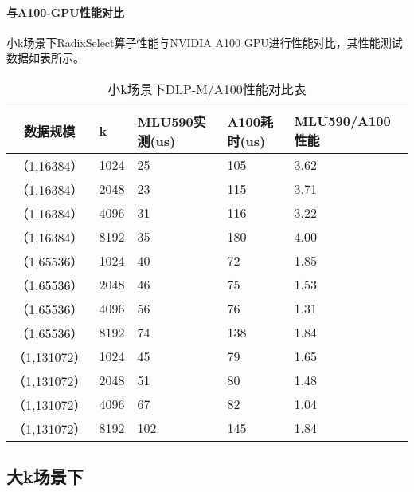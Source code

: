 \paragraph{与A100-GPU性能对比}
小k场景下RadixSelect算子性能与NVIDIA A100 GPU进行性能对比，其性能测试数据如表所示。
\begin{table}
    \centering
    \caption{小k场景下DLP-M/A100性能对比表}
    \begin{tabular}{cllll}
    \toprule
    数据规模 & k &   MLU590实测(us) & A100耗时(us) & MLU590/A100性能 \\
    \midrule
    （1,16384） & 1024    & 25 & 105 & 3.62 \\
    （1,16384） & 2048   & 23 & 115 & 3.71 \\
    （1,16384） & 4096   & 31 & 116 & 3.22 \\
    （1,16384） & 8192   & 35 & 180 & 4.00 \\
    （1,65536） & 1024    & 40 & 72 & 1.85 \\
    （1,65536） & 2048    & 46 & 75 & 1.53 \\
    （1,65536） & 4096    & 56 & 76 & 1.31 \\
    （1,65536） & 8192   & 74 & 138 & 1.84 \\

    （1,131072） & 1024    & 45 & 79 & 1.65 \\
    （1,131072） & 2048    & 51 & 80 & 1.48 \\
    （1,131072） & 4096    & 67 & 82 & 1.04 \\
    （1,131072） & 8192   & 102 & 145 & 1.84 \\
    
    \bottomrule
    \end{tabular}
    \end{table}
    


\subsection{大k场景下}

